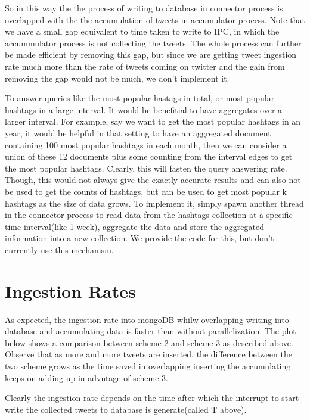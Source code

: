 \documentclass[letterpaper,10pt,english]{sphinxmanual}
\begin{document}
So in this way the the process of writing to database in connector process is overlapped with the the accumulation of tweets in accumulator process. Note that we have a small gap equivalent to time taken to write to IPC, in which the accummulator process is not collecting the tweets. The whole process can further be made efficient by removing this gap, but since we are getting tweet ingestion rate much more than the rate of tweets coming on twitter and the gain from removing the gap would not be much, we don’t implement it.

To answer queries like the most popular hastags in total, or most popular hashtags in a large interval. It would be benefitial to have aggregates over a larger interval. For example, say we want to get the most popular hashtags in an year, it would be helpful in that setting to have an aggregated document containing 100 most popular hashtags in each month, then we can consider a union of these 12 documents plus some counting from the interval edges to get the most popular hashtags. Clearly, this will fasten the query answering rate. Though, this would not always give the exactly accurate results and can also not be used to get the counts of hashtags, but can be used to get most popular k hashtags as the size of data grows. To implement it, simply spawn another thread in the connector process to read data from the hashtags collection at a specific time interval(like 1 week), aggregate the data and store the aggregated information into a new collection. We provide the code for this, but don’t currently use this mechanism.


\section{Ingestion Rates}
\label{\detokenize{mongoDB_data_ingestion:ingestion-rates}}
As expected, the ingestion rate into mongoDB whilw overlapping writing into database and accumulating data is faster than without parallelization. The plot below shows a comparison between scheme 2 and scheme 3 as described above. Observe that as more and more tweets are inserted, the difference between the two scheme grows as the time saved in overlapping inserting the accumulating keeps on adding up in advntage of scheme 3.

\noindent{}

Clearly the ingestion rate depends on the time after which the interrupt to start write the collected tweets to database is generate(called T above).
\end{document}
